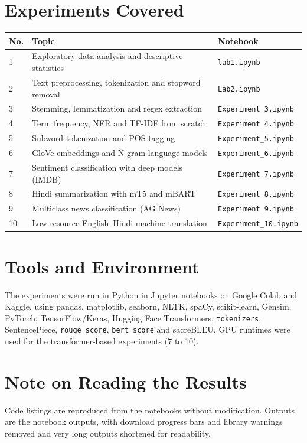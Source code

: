 \documentclass[12pt,a4paper,oneside]{report}
\begin{document}
\section{Experiments Covered}
\begin{longtable}{@{}p{1.2cm}p{7.6cm}p{5.3cm}@{}}
\toprule \textbf{No.} & \textbf{Topic} & \textbf{Notebook}\\\midrule
1 & Exploratory data analysis and descriptive statistics & \texttt{lab1.ipynb}\\
2 & Text preprocessing, tokenization and stopword removal & \texttt{Lab2.ipynb}\\
3 & Stemming, lemmatization and regex extraction & \texttt{Experiment\_3.ipynb}\\
4 & Term frequency, NER and TF-IDF from scratch & \texttt{Experiment\_4.ipynb}\\
5 & Subword tokenization and POS tagging & \texttt{Experiment\_5.ipynb}\\
6 & GloVe embeddings and N-gram language models & \texttt{Experiment\_6.ipynb}\\
7 & Sentiment classification with deep models (IMDB) & \texttt{Experiment\_7.ipynb}\\
8 & Hindi summarization with mT5 and mBART & \texttt{Experiment\_8.ipynb}\\
9 & Multiclass news classification (AG News) & \texttt{Experiment\_9.ipynb}\\
10 & Low-resource English--Hindi machine translation & \texttt{Experiment\_10.ipynb}\\
\bottomrule
\end{longtable}

\section{Tools and Environment}
The experiments were run in Python in Jupyter notebooks on Google Colab and Kaggle, using pandas, matplotlib, seaborn, NLTK, spaCy, scikit-learn, Gensim, PyTorch, TensorFlow/Keras, Hugging Face Transformers, \texttt{tokenizers}, SentencePiece, \texttt{rouge\_score}, \texttt{bert\_score} and sacreBLEU. GPU runtimes were used for the transformer-based experiments (7 to 10).

\section{Note on Reading the Results}
Code listings are reproduced from the notebooks without modification. Outputs are the notebook outputs, with download progress bars and library warnings removed and very long outputs shortened for readability.
\end{document}
